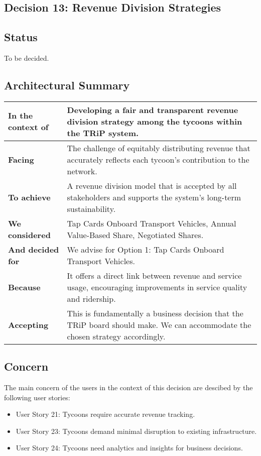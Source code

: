 \subsection{Decision 13: Revenue Division Strategies}

\subsection*{Status}
To be decided.

\subsection*{Architectural Summary}
\begin{tabular}{|p{3.5cm}|p{10.5cm}|}
    \hline
    \textbf{In the context of} & Developing a fair and transparent revenue division strategy among the tycoons within the TRiP system. \\
    \hline
    \textbf{Facing} & The challenge of equitably distributing revenue that accurately reflects each tycoon's contribution to the network. \\
    \hline
    \textbf{To achieve} & A revenue division model that is accepted by all stakeholders and supports the system's long-term sustainability. \\
    \hline
    \textbf{We considered} & Tap Cards Onboard Transport Vehicles, Annual Value-Based Share, Negotiated Shares. \\
    \hline
    \textbf{And decided for} & We advise for Option 1: Tap Cards Onboard Transport Vehicles. \\
    \hline
    \textbf{Because} & It offers a direct link between revenue and service usage, encouraging improvements in service quality and ridership. \\
    \hline
    \textbf{Accepting} & This is fundamentally a business decision that the TRiP board should make. We can accommodate the chosen strategy accordingly. \\
    \hline
\end{tabular}

\subsection*{Concern}
The main concern of the users in the context of this decision are descibed by the following user stories: 
\begin{itemize}
    \item User Story 21: Tycoons require accurate revenue tracking.
    \item User Story 23: Tycoons demand minimal disruption to existing infrastructure.
    \item User Story 24: Tycoons need analytics and insights for business decisions.
\end{itemize}

